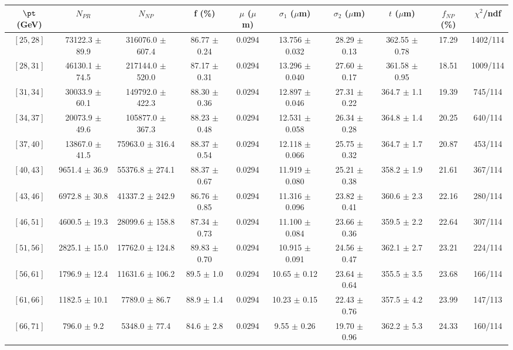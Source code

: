 \begin{tabular}{c||c|c|c|c|c|c|c||c|c}
$\pt$ (GeV) & $N_{PR}$ & $N_{NP}$ & f (\%) & $\mu$ ($\mu$m) & $\sigma_1$ ($\mu$m) & $\sigma_2$ ($\mu$m)  & $t$ ($\mu$m) & $f_{NP}$ (\%) & $\chi^2$/ndf \\
\hline
$[25, 28]$ & 73122.3 $\pm$ 89.9 & 316076.0 $\pm$ 607.4 & 86.77 $\pm$ 0.24 & 0.0294 & 13.756 $\pm$ 0.032 & 28.29 $\pm$ 0.13 & 362.55 $\pm$ 0.78 & 17.29 & 1402/114\\
$[28, 31]$ & 46130.1 $\pm$ 74.5 & 217144.0 $\pm$ 520.0 & 87.17 $\pm$ 0.31 & 0.0294 & 13.296 $\pm$ 0.040 & 27.60 $\pm$ 0.17 & 361.58 $\pm$ 0.95 & 18.51 & 1009/114\\
$[31, 34]$ & 30033.9 $\pm$ 60.1 & 149792.0 $\pm$ 422.3 & 88.30 $\pm$ 0.36 & 0.0294 & 12.897 $\pm$ 0.046 & 27.31 $\pm$ 0.22 & 364.7 $\pm$ 1.1 & 19.39 & 745/114\\
$[34, 37]$ & 20073.9 $\pm$ 49.6 & 105877.0 $\pm$ 367.3 & 88.23 $\pm$ 0.48 & 0.0294 & 12.531 $\pm$ 0.058 & 26.34 $\pm$ 0.28 & 364.8 $\pm$ 1.4 & 20.25 & 640/114\\
$[37, 40]$ & 13867.0 $\pm$ 41.5 & 75963.0 $\pm$ 316.4 & 88.37 $\pm$ 0.54 & 0.0294 & 12.118 $\pm$ 0.066 & 25.75 $\pm$ 0.32 & 364.7 $\pm$ 1.7 & 20.87 & 453/114\\
$[40, 43]$ & 9651.4 $\pm$ 36.9 & 55376.8 $\pm$ 274.1 & 88.37 $\pm$ 0.67 & 0.0294 & 11.919 $\pm$ 0.080 & 25.21 $\pm$ 0.38 & 358.2 $\pm$ 1.9 & 21.61 & 367/114\\
$[43, 46]$ & 6972.8 $\pm$ 30.8 & 41337.2 $\pm$ 242.9 & 86.76 $\pm$ 0.85 & 0.0294 & 11.316 $\pm$ 0.096 & 23.82 $\pm$ 0.41 & 360.6 $\pm$ 2.3 & 22.16 & 280/114\\
$[46, 51]$ & 4600.5 $\pm$ 19.3 & 28099.6 $\pm$ 158.8 & 87.34 $\pm$ 0.73 & 0.0294 & 11.100 $\pm$ 0.084 & 23.66 $\pm$ 0.36 & 359.5 $\pm$ 2.2 & 22.64 & 307/114\\
$[51, 56]$ & 2825.1 $\pm$ 15.0 & 17762.0 $\pm$ 124.8 & 89.83 $\pm$ 0.70 & 0.0294 & 10.915 $\pm$ 0.091 & 24.56 $\pm$ 0.47 & 362.1 $\pm$ 2.7 & 23.21 & 224/114\\
$[56, 61]$ & 1796.9 $\pm$ 12.4 & 11631.6 $\pm$ 106.2 & 89.5 $\pm$ 1.0 & 0.0294 & 10.65 $\pm$ 0.12 & 23.64 $\pm$ 0.64 & 355.5 $\pm$ 3.5 & 23.68 & 166/114\\
$[61, 66]$ & 1182.5 $\pm$ 10.1 & 7789.0 $\pm$ 86.7 & 88.9 $\pm$ 1.4 & 0.0294 & 10.23 $\pm$ 0.15 & 22.43 $\pm$ 0.76 & 357.5 $\pm$ 4.2 & 23.99 & 147/113\\
$[66, 71]$ & 796.0 $\pm$ 9.2 & 5348.0 $\pm$ 77.4 & 84.6 $\pm$ 2.8 & 0.0294 & 9.55 $\pm$ 0.26 & 19.70 $\pm$ 0.96 & 362.2 $\pm$ 5.3 & 24.33 & 160/114\\

\end{tabular}
